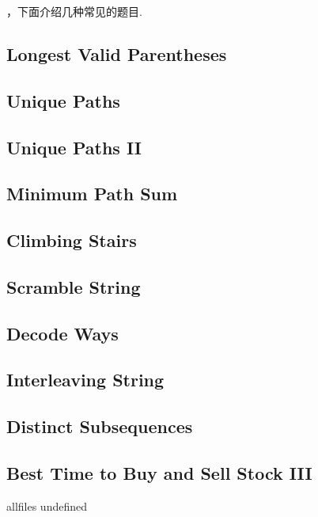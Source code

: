 \documentclass{article}
\begin{document}
\begin{CJK}{UTF8}{gbsn}     %

\else
    
，下面介绍几种常见的题目.
\\
\fi
\subsection{Longest Valid Parentheses}

\subsection{Unique Paths}

\subsection{Unique Paths II}

\subsection{Minimum Path Sum}

\subsection{Climbing Stairs}

\subsection{Scramble String}

\subsection{Decode Ways}

\subsection{Interleaving String}

\subsection{Distinct Subsequences}

\subsection{Best Time to Buy and Sell Stock III}


\ifx allfiles undefined
\end{CJK}
\end{document}
